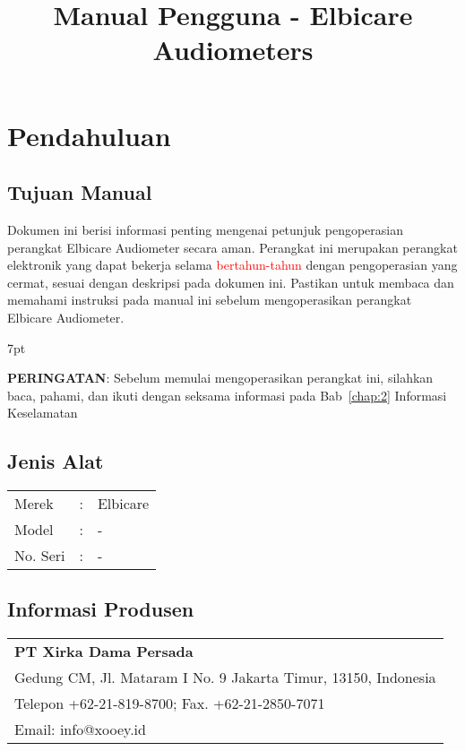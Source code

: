 \documentclass[11pt,a4paper,twoside,draft,onecolumn]{book}
\title{Manual Pengguna - Elbicare Audiometers}
\newenvironment{formalred}{%
	\def\FrameCommand{%
		\hspace{1pt}%
		{\color{red}\vrule width 2pt}%
		{\color{formalshade}\vrule width 4pt}%
		\colorbox{formalshade}%
	}%
	\MakeFramed{\advance\hsize-\width\FrameRestore}%
	\noindent\hspace{-4.55pt}%
	\begin{adjustwidth}{}{7pt}%
		\vspace{2pt}\vspace{2pt}%
	}
	{%
		\vspace{2pt}\end{adjustwidth}\endMakeFramed%
}
\begin{document}
	
	\maketitle
	\renewcommand\contentsname{Daftar Isi}
	\tableofcontents
	
	\renewcommand\listfigurename{Daftar Gambar}
	\listoffigures
	
	\renewcommand\listtablename{Daftar Tabel}
	\listoftables
	\newpage
	
	\renewcommand\chaptername{Bab}
	
	\chapter{Pendahuluan}
		\section{Tujuan Manual}
		Dokumen ini berisi informasi penting mengenai petunjuk pengoperasian perangkat Elbicare Audiometer secara aman. Perangkat ini merupakan perangkat elektronik yang dapat bekerja selama \textcolor{red}{bertahun-tahun} dengan pengoperasian yang cermat, sesuai dengan deskripsi pada dokumen ini. Pastikan untuk membaca dan memahami instruksi pada manual ini sebelum mengoperasikan perangkat Elbicare Audiometer. 
		
		\begin{formalred}
			\raisebox{0.325ex}{\resizebox{!}{2ex}{\danger}} \textbf{PERINGATAN}:
			Sebelum memulai mengoperasikan perangkat ini, silahkan baca, pahami, dan ikuti dengan seksama informasi pada Bab~\ref{chap:2} Informasi Keselamatan 
		\end{formalred}
		
		\section{Jenis Alat}
		\begin{tabular}{lcl}
			Merek & : & Elbicare\\
			Model & : & -\\
			No. Seri & : & -\\
		\end{tabular}
		
		\section{Informasi Produsen}
		\begin{tabular}{l}
			\textbf{PT Xirka Dama Persada}\\
			Gedung CM, Jl. Mataram I No. 9 Jakarta Timur, 13150, Indonesia\\
			Telepon +62-21-819-8700; Fax. +62-21-2850-7071\\
			Email: info@xooey.id\\
		\end{tabular}
		
\end{document}
